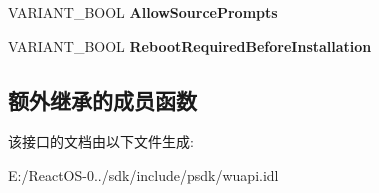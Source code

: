 \begin{DoxyCompactItemize}
\mbox{\label{interface_w_u_api_lib_1_1_i_update_installer_a0b894f7fed951f2a5c3843c0686b9140}} 
V\+A\+R\+I\+A\+N\+T\+\_\+\+B\+O\+OL {\bfseries Allow\+Source\+Prompts}
\item 
\mbox{\label{interface_w_u_api_lib_1_1_i_update_installer_a2f18503da22f86df6ea079feb16bb21f}} 
V\+A\+R\+I\+A\+N\+T\+\_\+\+B\+O\+OL {\bfseries Reboot\+Required\+Before\+Installation}
\end{DoxyCompactItemize}
\subsection*{额外继承的成员函数}


该接口的文档由以下文件生成\+:\begin{DoxyCompactItemize}
\item 
E\+:/\+React\+O\+S-\/0../sdk/include/psdk/wuapi.\+idl\end{DoxyCompactItemize}
